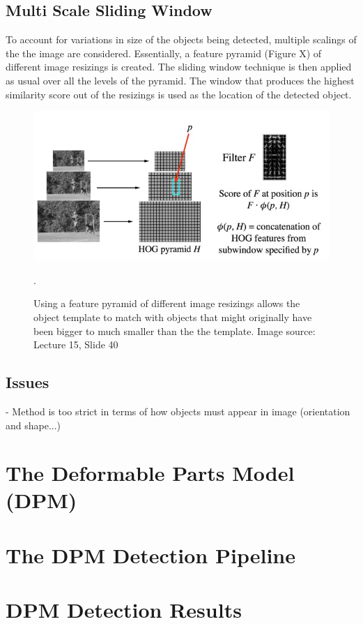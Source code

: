 \documentclass{article}
\begin{document}
\subsection{Multi Scale Sliding Window}
To account for variations in size of the objects being detected, multiple scalings of the the image are considered. Essentially, a feature pyramid (Figure X) of different image resizings is created. The sliding window technique is then applied as usual over all the levels of the pyramid. The window that produces the highest similarity score out of the resizings is used as the location of the detected object.

\begin{figure}[h]
	\includegraphics[width=\linewidth]{feature_pyramid.jpg}
	\caption{Using a feature pyramid of different image resizings allows the object template to match with objects that might originally have been bigger to much smaller than the the template. Image source: Lecture 15, Slide 40}.
\end{figure}

\subsection{Issues}
- Method is too strict in terms of how objects must appear in image (orientation and shape...)


\section{The Deformable Parts Model (DPM)}

\section{The DPM Detection Pipeline}

\section{DPM Detection Results}



\small


\cite{hog_human_detection}
\end{document}
